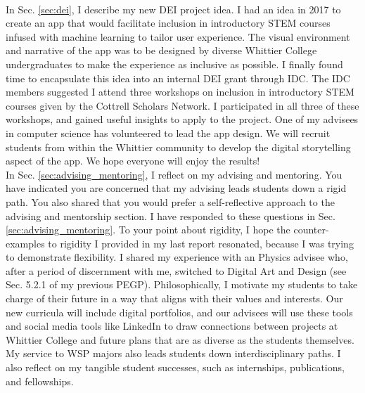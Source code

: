 \documentclass[../../main.tex]{subfiles}
\begin{document}
\\
\vspace{0.15cm}
In Sec. \ref{sec:dei}, I describe my new DEI project idea.  I had an idea in 2017 to create an app that would facilitate inclusion in introductory STEM courses infused with machine learning to tailor user experience.  The visual environment and narrative of the app was to be designed by diverse Whittier College undergraduates to make the experience as inclusive as possible.  I finally found time to encapsulate this idea into an internal DEI grant through IDC.  The IDC members suggested I attend three workshops on inclusion in introductory STEM courses given by the Cottrell Scholars Network.  I participated in all three of these workshops, and gained useful insights to apply to the project.  One of my advisees in computer science has volunteered to lead the app design.  We will recruit students from within the Whittier community to develop the digital storytelling aspect of the app.  We hope everyone will enjoy the results!
\\
\vspace{0.15cm}
In Sec. \ref{sec:advising_mentoring}, I reflect on my advising and mentoring.  You have indicated you are concerned that my advising leads students down a rigid path.  You also shared that you would prefer a self-reflective approach to the advising and mentorship section.  I have responded to these questions in Sec. \ref{sec:advising_mentoring}.  To your point about rigidity, I hope the counter-examples to rigidity I provided in my last report resonated, because I was trying to demonstrate flexibility.  I shared my experience with an Physics advisee who, after a period of discernment with me, switched to Digital Art and Design (see Sec. 5.2.1 of my previous PEGP).  Philosophically, I motivate my students to take charge of their future in a way that aligns with their values and interests.  Our new curricula will include digital portfolios, and our advisees will use these tools and social media tools like LinkedIn to draw connections between projects at Whittier College and future plans that are as diverse as the students themselves.  My service to WSP majors also leads students down interdisciplinary paths.  I also reflect on my tangible student successes, such as internships, publications, and fellowships.
\\
\vspace{0.15cm}
\end{document}

